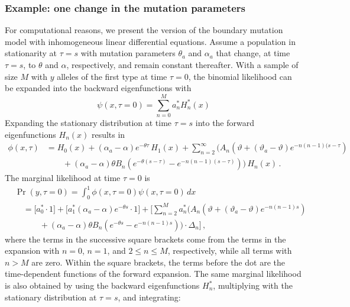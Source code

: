 \documentclass[preprint]{elsarticle}
\begin{document}
\subsubsection{Example: one change in the mutation parameters}

For computational reasons, we present the version of the boundary mutation model with inhomogeneous linear differential equations. Assume a population in stationarity at $\tau=s$ with mutation parameters $\theta_a$ and $\alpha_a$ that change, at time $\tau=s$, to $\theta$ and $\alpha$, respectively, and remain constant thereafter. With a sample of size $M$ with $y$ alleles of the first type at time $\tau=0$, the binomial likelihood can be expanded into the backward eigenfunctions with 
\begin{equation}
    \psi(x,\tau=0)=\sum_{n=0}^M a_n^{*} H_n^{*}(x)
\end{equation}
Expanding the stationary distribution at time $\tau=s$ into the forward eigenfunctions $H_n(x)$ results in
\begin{equation}
\begin{split}
    \phi(x,\tau)&= H_0(x)+(\alpha_a-\alpha) e^{-\theta \tau}\,H_1(x)+\sum_{n=2}^\infty \bigg(A_n(\vartheta+(\vartheta_a-\vartheta) e^{-n(n-1)(s-\tau})\\
    &\qquad+(\alpha_a-\alpha) \theta B_n (e^{-\theta (s-\tau)}-e^{-n(n-1) (s-\tau)})\bigg)\,H_n(x)\,.
\end{split}
\end{equation}
The marginal likelihood at time $\tau=0$ is
\begin{equation}
\begin{split}
    &\Pr(y,\tau=0)=\int_0^1 \phi(x,\tau=0)\psi(x,\tau=0)\,dx\\
    &\quad=\bigg[a_0^{*}\cdot 1\bigg]+\bigg[a_1^{*}(\alpha_a-\alpha) e^{-\theta s}\cdot 1\bigg]+\bigg[\sum_{n=2}^M a_n^{*}\bigg(A_n(\vartheta+(\vartheta_a-\vartheta) e^{-n(n-1)s}) \\
    &\quad\qquad+(\alpha_a-\alpha)\theta B_n (e^{-\theta s}-e^{-n(n-1) s})\bigg)\cdot\Delta_n\bigg]\,,\
\end{split}
\end{equation}
where the terms in the successive square brackets come from the terms in the expansion with $n=0$, $n=1$, and $2\leq n\leq M$, respectively, while all terms with $n>M$ are zero. Within the square brackets, the terms before the dot are the time-dependent functions of the forward expansion. The same marginal likelihood is also obtained by using the backward eigenfunctions $H_n^{*}$, multiplying with the stationary distribution at $\tau=s$, and integrating:
\end{document}

